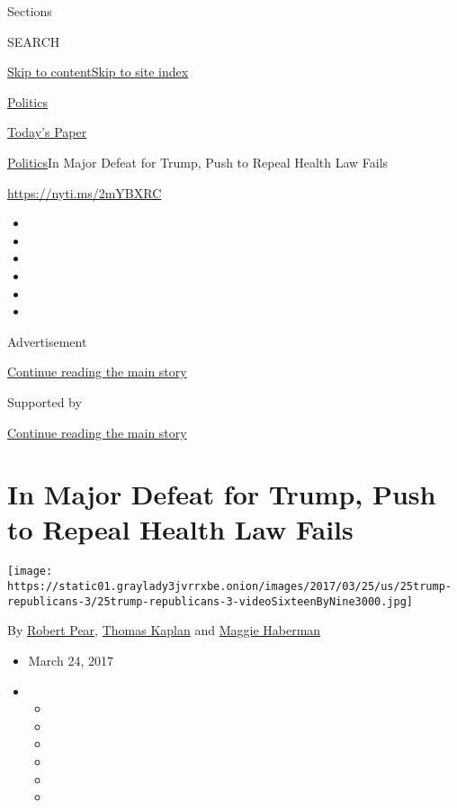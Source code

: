 Sections

SEARCH

\protect\hyperlink{site-content}{Skip to
content}\protect\hyperlink{site-index}{Skip to site index}

\href{https://www.nytimes3xbfgragh.onion/section/politics}{Politics}

\href{https://myaccount.nytimes3xbfgragh.onion/auth/login?response_type=cookie\&client_id=vi}{}

\href{https://www.nytimes3xbfgragh.onion/section/todayspaper}{Today's
Paper}

\href{/section/politics}{Politics}\textbar{}In Major Defeat for Trump,
Push to Repeal Health Law Fails

\url{https://nyti.ms/2mYBXRC}

\begin{itemize}
\item
\item
\item
\item
\item
\item
\end{itemize}

Advertisement

\protect\hyperlink{after-top}{Continue reading the main story}

Supported by

\protect\hyperlink{after-sponsor}{Continue reading the main story}

\hypertarget{in-major-defeat-for-trump-push-to-repeal-health-law-fails}{%
\section{In Major Defeat for Trump, Push to Repeal Health Law
Fails}\label{in-major-defeat-for-trump-push-to-repeal-health-law-fails}}

\texttt{[image: https://static01.graylady3jvrrxbe.onion/images/2017/03/25/us/25trump-republicans-3/25trump-republicans-3-videoSixteenByNine3000.jpg]}

By \href{https://www.nytimes3xbfgragh.onion/by/robert-pear}{Robert
Pear}, \href{http://www.nytimes3xbfgragh.onion/by/thomas-kaplan}{Thomas
Kaplan} and
\href{http://www.nytimes3xbfgragh.onion/by/maggie-haberman}{Maggie
Haberman}

\begin{itemize}
\item
  March 24, 2017
\item
  \begin{itemize}
  \item
  \item
  \item
  \item
  \item
  \item
  \end{itemize}
\end{itemize}

